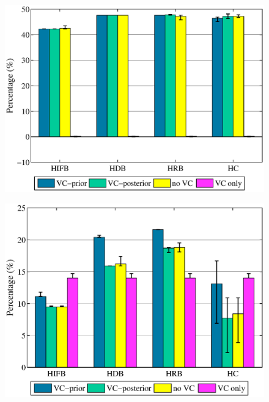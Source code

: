 \begin{figure}[!htb]
	\centering
	\includegraphics[width=1.0\linewidth]{figures/evaluation/vc_cybershake2.eps}
	\label{fig:evaluation_vc_cybershake}
\end{figure}



\begin{figure}[!htb]
	\centering
    \includegraphics[width=1\linewidth]{figures/evaluation/vc_ligo2.eps}
    \label{fig:evaluation_vc_ligo}
\end{figure}


